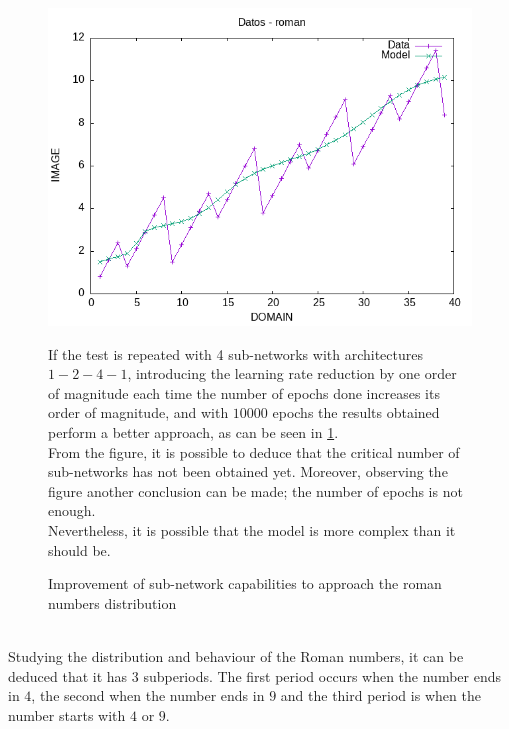 \documentclass[a4paper, 11pt]{article}
\begin{document}
\begin{figure}[h]
    \begin{minipage}{5.5cm}
        \begin{center}
            \includegraphics[width = 1 \linewidth]{img/roman/roman_third_approach.png}
            \caption{Improvement of sub-network capabilities to approach the roman numbers distribution}
            \label{second-approach}
        \end{center}
    \end{minipage} \hspace{1em}
    \begin{minipage}{9cm}
 If the test is repeated with 4 sub-networks with architectures $1-2-4-1$, introducing the learning rate reduction by one order of magnitude each time the number of epochs done increases its order of magnitude, and with $10000$ epochs the results obtained perform a better approach, as can be seen in \ref{second-approach}.\\
 From the figure, it is possible to deduce that the critical number of sub-networks has not been obtained yet. Moreover, observing the figure another conclusion can be made; the number of epochs is not enough.\\
 Nevertheless, it is possible that the model is more complex than it should be.
    \end{minipage}
\end{figure}\\
Studying the distribution and behaviour of the Roman numbers, it can be deduced that it has 3 subperiods.
The first period occurs when the number ends in $4$, the second when the number ends in $9$ and the third period is when the number starts with $4$ or $9$.
\end{document}
